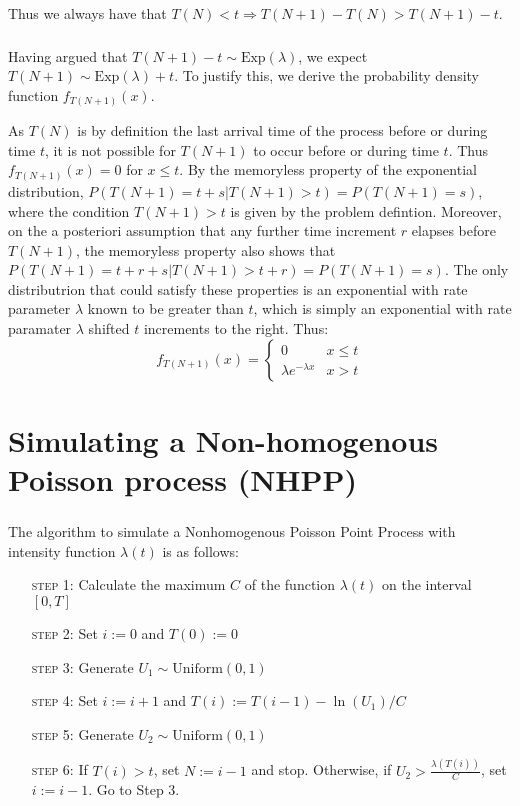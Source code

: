 \documentclass[11pt, oneside]{article}   	%
\begin{document}
Thus we always have that $T(N) < t \Rightarrow T(N + 1) - T(N) > T(N + 1) - t$.
\section{}
Having argued that $T(N + 1) - t \sim \text{Exp}(\lambda)$, we expect $T(N + 1) \sim \text{Exp}(\lambda) + t$. To justify this, we derive the probability density function $f_{T(N + 1)}(x)$.

As $T(N)$ is by definition the last arrival time of the process before or during time $t$, it is not possible for $T(N + 1)$ to occur before or during time $t$. Thus $f_{T(N + 1)}(x) = 0$ for $x \leq t$. By the memoryless property of the exponential distribution, $P(T(N + 1) = t + s | T(N + 1) > t) = P(T(N + 1) = s)$, where the condition $T(N + 1) > t$ is given by the problem defintion. Moreover, on the a posteriori assumption that any further time increment $r$ elapses before $T(N + 1)$, the memoryless property also shows that $P(T(N + 1) = t + r + s | T(N + 1) > t + r) = P(T(N + 1) = s)$. The only distributrion that could satisfy these properties is an exponential with rate parameter $\lambda$ known to be greater than $t$, which is simply an exponential with rate paramater $\lambda$ shifted $t$ increments to the right. Thus:
\[
f_{T(N + 1)}(x) =
\begin{cases} 
      0 & x \leq t \\
      \lambda e^{-\lambda x} & x > t 
   \end{cases}
\]

\part{Simulating a Non-homogenous Poisson process (NHPP)}
\section{}
The algorithm to simulate a Nonhomogenous Poisson Point Process with intensity function $\lambda(t)$ is as follows:
\begin{enumerate}[leftmargin=30pt,labelindent=65pt,itemindent=30pt]
\item[\textsc{step 1:}] Calculate the maximum $C$ of the function $\lambda(t)$ on the interval $[0,T]$
\item[\textsc{step 2:}] Set $i:=0$ and $T(0):=0$
\item[\textsc{step 3:}] Generate $U_1 \sim \text{Uniform}(0,1)$
\item[\textsc{step 4:}] Set $i:=i+1$ and $T(i) := T(i-1) - \ln(U_1)/C$
\item[\textsc{step 5:}] Generate $U_2 \sim\text{Uniform}(0,1)$
\item[\textsc{step 6:}] If $T(i) > t$, set $N:=i-1$ and stop. Otherwise, if $U_2 > \frac{\lambda(T(i))}{C}$, set $i:=i-1$. Go to Step 3.
\end{enumerate}
\end{document}

